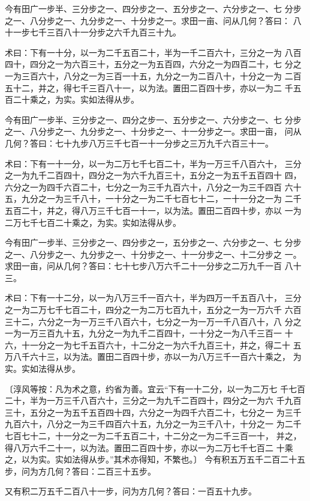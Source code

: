 \documentclass[12pt,UTF8]{ctexbook}
\begin{document}
今有田广一步半、三分步之一、四分步之一、五分步之一、六分步之一、七 分步之一、八分步之一、九分步之一、十分步之一。求田一亩、问从几何？答曰： 八十一步七千三百八十一分步之六千九百三十九。

术曰：下有一十分，以一为二千五百二十，半为一千二百六十，三分之一为 八百四十，四分之一为六百三十，五分之一为五百四，六分之一为四百二十，七 分之一为三百六十，八分之一为三百一十五，九分之一为二百八十，十分之一为 二百五十二，并之，得七千三百八十一，以为法。置田二百四十步，亦以一为二 千五百二十乘之，为实。实如法得从步。

今有田广一步半、三分步之一、四分之步一、五分步之一、六分步之一、七 分步之一、八分步之一、九分步之一、十分步之一、十一分步之一。求田一亩， 问从几何？答曰：七十九步八万三千七百一十一分步之三万九千六百三十一。

术曰：下有一十一分，以一为二万七千七百二十，半为一万三千八百六十， 三分之一为九千二百四十，四分之一为六千九百三十，五分之一为五千五百四十 四，六分之一为四千六百二十，七分之一为三千九百六十，八分之一为三千四百 六十五，九分之一为三千八十，一十分之一为二千七百七十二，一十一分之一为 二千五百二十，并之，得八万三千七百一十一，以为法。置田二百四十步，亦以 一为二万七千七百二十乘之，为实。实如法得从步。

今有田广一步半、三分步之一、四分步之一，五分步之一、六分步之一、七 分步之一、八分步之一、九分步之一、十分步之一、十一分步之一、十二分步之 一。求田一亩，问从几何？答曰：七十七步八万六千二十一分步之二万九千一百 八十三。

术曰：下有一十二分，以一为八万三千一百六十，半为四万一千五百八十， 三分之一为二万七千七百二十，四分之一为二万七百九十，五分之一为一万六千 六百三十二，六分之一为一万三千八百六十，七分之一为一万一千八百八十，八 分之一为一万三百九十五，九分之一为九千二百四十，一十分之一为八千三百一 十六，十一分之一为七千五百六十，十二分之一为六千九百三十，并之，得二十 五万八千六十三，以为法。置田二百四十步，亦以一为八万三千一百六十乘之， 为实。实如法得从步。

〔淳风等按：凡为术之意，约省为善。宜云“下有一十二分，以一为二万七 千七百二十，半为一万三千八百六十，三分之一为九千二百四十，四分之一为六 千九百三十，五分之一为五千五百四十四，六分之一为四千六百二十，七分之一 为三千九百六十，八分之一为三千四百六十五，九分之一为三千八十，十分之一 为二千七百七十二，十一分之一为二千五百二十，十二分之一为二千三百一十， 并之，得八万六千二十一，以为法。置田二百四十步，亦以一为二万七千七百二 十乘之，以为实。实如法得从步。”其术亦得知，不繁也。〕 今有积五万五千二百二十五步，问为方几何？答曰：二百三十五步。

又有积二万五千二百八十一步，问为方几何？答曰：一百五十九步。
\end{document}
